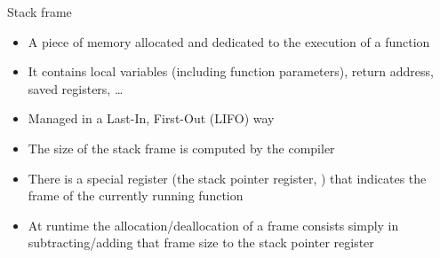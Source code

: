 \begin{frame}{Stack frame}

  \begin{itemize}[<+->]
  \item A piece of memory allocated and dedicated to the execution of a function
  \item It contains local variables (including function parameters), return
    address, saved registers, \ldots
  \item Managed in a Last-In, First-Out (LIFO) way
  \item The size of the stack frame is computed by the compiler
  \item There is a special register (the stack pointer register, )
    that indicates the frame of the currently running function
  \item At runtime the allocation/deallocation of a frame consists simply in
    subtracting/adding that frame size to the stack pointer register
  \end{itemize}
\end{frame}

